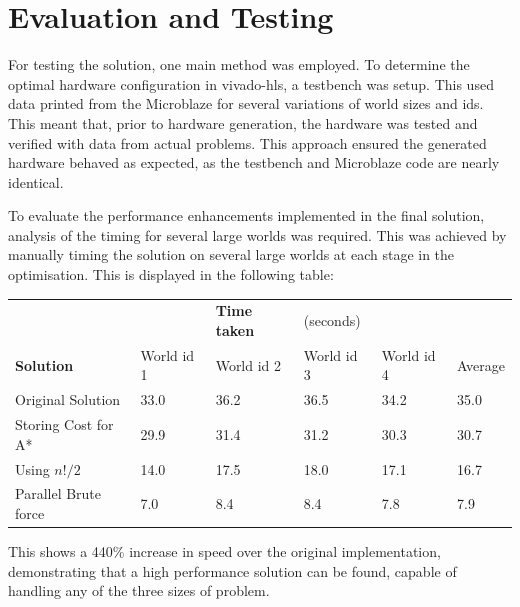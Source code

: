 \documentclass[a4paper, 11pt]{article}
\begin{document}
\section{Evaluation and Testing} %
For testing the solution, one main method was employed. To
determine the optimal hardware configuration in vivado-hls, a testbench was setup. This
used data printed from the Microblaze for several variations of world sizes and 
ids. This meant that, prior to hardware generation, the hardware was tested and 
verified with data from actual problems. This approach ensured the generated hardware 
behaved as expected, as the testbench and Microblaze code are nearly identical. 
\par\bigskip\noindent
To evaluate the performance enhancements implemented in the final solution,
analysis of the timing for several large worlds was required. This
was achieved by manually timing the solution on several large worlds at each
stage in the optimisation. This is displayed in the following table: 
\begin{table}[!htbp]
\centering
\begin{tabular}{l|lllll}
                  &  &  \textbf{Time taken} & (seconds)          & \\ 
    \textbf{Solution} & World id 1          & World id 2 & World id 3 & World id 4 & Average\\ \hline
    Original Solution    & 33.0             & 36.2       & 36.5   & 34.2 & 35.0 \\ 
    Storing Cost for A*  & 29.9             & 31.4       & 31.2   & 30.3 & 30.7 \\ 
    Using $n!/2$         & 14.0             & 17.5       & 18.0   & 17.1 & 16.7 \\ 
    Parallel Brute force & 7.0              & 8.4        & 8.4    & 7.8  & 7.9 
\end{tabular}
\end{table}
\FloatBarrier\noindent
This shows a 440\% increase in speed over the original implementation,
demonstrating that a high performance solution can be found, capable of handling 
any of the three sizes of problem. 


\end{document}
